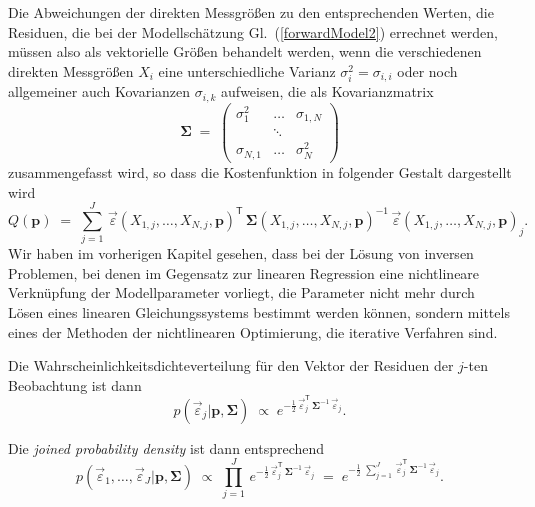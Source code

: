 Die Abweichungen der direkten Messgrößen zu den entsprechenden Werten, die Residuen,
die bei der Modellschätzung Gl.~(\ref{forwardModel2}) errechnet werden, müssen also als
vektorielle Größen behandelt werden, wenn die verschiedenen direkten Messgrößen $X_i$ eine
unterschiedliche Varianz $\sigma_i^2 = \sigma_{i,i}$ oder noch allgemeiner auch
Kovarianzen $\sigma_{i,k}$ aufweisen, die als Kovarianzmatrix
\begin{equation}
\boldsymbol{\Sigma} \; = \;
\left(\begin{array}{ccc}
\sigma_1^2 & \dots & \sigma_{1,N}\\
 & \ddots & \\
\sigma_{N,1} & \dots & \sigma_N^2
\end{array}\right)
\end{equation}
zusammengefasst wird, so dass die Kostenfunktion in folgender Gestalt dargestellt wird
\begin{equation}
Q(\mathbf{p}) \; = \;
 \sum\limits_{j=1}^J \, \vec \varepsilon(X_{1,j},\dots,X_{N,j},\mathbf{p})^\mathsf{T} \,
\boldsymbol{\Sigma}(X_{1,j},\dots,X_{N,j},\mathbf{p})^{-1} \, \vec \varepsilon(X_{1,j},\dots,X_{N,j},\mathbf{p})_j .
\label{generalLSmethod}
\end{equation}
Wir haben im vorherigen Kapitel gesehen, dass
bei der Lösung von inversen Problemen, bei denen im Gegensatz zur linearen
Regression eine nichtlineare Verknüpfung der Modellparameter vorliegt,
die Parameter nicht mehr durch Lösen eines linearen Gleichungssystems
bestimmt werden können, sondern mittels eines der Methoden der
nichtlinearen Optimierung, die iterative Verfahren sind.


Die Wahrscheinlichkeitsdichteverteilung für den Vektor der Residuen der
$j$-ten Beobachtung ist dann
\begin{equation}
p(\vec \varepsilon_j | \mathbf{p}, \boldsymbol{\Sigma}) \; \propto \;
e^{-\frac{1}{2} \, \vec \varepsilon^\mathsf{T}_j \, \boldsymbol{\Sigma}^{-1} \, \vec \varepsilon_j }.
\end{equation}

Die \textsl{joined probability density} ist dann entsprechend
\begin{equation}
p(\vec \varepsilon_1,\dots, \vec \varepsilon_J | \mathbf{p}, \boldsymbol{\Sigma}) \; \propto \;
\prod\limits_{j=1}^J \,
e^{-\frac{1}{2} \, \vec \varepsilon^\mathsf{T}_j \, \boldsymbol{\Sigma}^{-1} \, \vec \varepsilon_j } \; = \;
e^{-\frac{1}{2} \; \sum\limits_{j=1}^J \, \vec \varepsilon^\mathsf{T}_j \, \boldsymbol{\Sigma}^{-1} \, \vec \varepsilon_j } .
\label{LikelihoodKov}
\end{equation}


